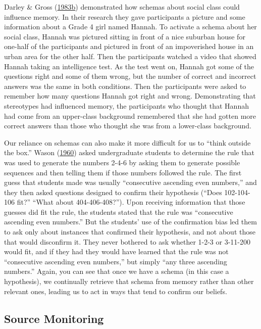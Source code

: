 \documentclass[
]{krantz}
\begin{document}
Darley \& Gross (\protect\hyperlink{ref-darley1983hypothesis}{1983b}) demonstrated how schemas about social class could influence memory. In their research they gave participants a picture and some information about a Grade 4 girl named Hannah. To activate a schema about her social class, Hannah was pictured sitting in front of a nice suburban house for one-half of the participants and pictured in front of an impoverished house in an urban area for the other half. Then the participants watched a video that showed Hannah taking an intelligence test. As the test went on, Hannah got some of the questions right and some of them wrong, but the number of correct and incorrect answers was the same in both conditions. Then the participants were asked to remember how many questions Hannah got right and wrong. Demonstrating that stereotypes had influenced memory, the participants who thought that Hannah had come from an upper-class background remembered that she had gotten more correct answers than those who thought she was from a lower-class background.

Our reliance on schemas can also make it more difficult for us to ``think outside the box.'' Wason (\protect\hyperlink{ref-Wason1960}{1960}) asked undergraduate students to determine the rule that was used to generate the numbers 2-4-6 by asking them to generate possible sequences and then telling them if those numbers followed the rule. The first guess that students made was usually ``consecutive ascending even numbers,'' and they then asked questions designed to confirm their hypothesis (``Does 102-104-106 fit?'' ``What about 404-406-408?''). Upon receiving information that those guesses did fit the rule, the students stated that the rule was ``consecutive ascending even numbers.'' But the students' use of the confirmation bias led them to ask only about instances that confirmed their hypothesis, and not about those that would disconfirm it. They never bothered to ask whether 1-2-3 or 3-11-200 would fit, and if they had they would have learned that the rule was not ``consecutive ascending even numbers,'' but simply ``any three ascending numbers.'' Again, you can see that once we have a schema (in this case a hypothesis), we continually retrieve that schema from memory rather than other relevant ones, leading us to act in ways that tend to confirm our beliefs.

\hypertarget{source-monitoring}{%
\subsection{Source Monitoring}\label{source-monitoring}}
\end{document}
